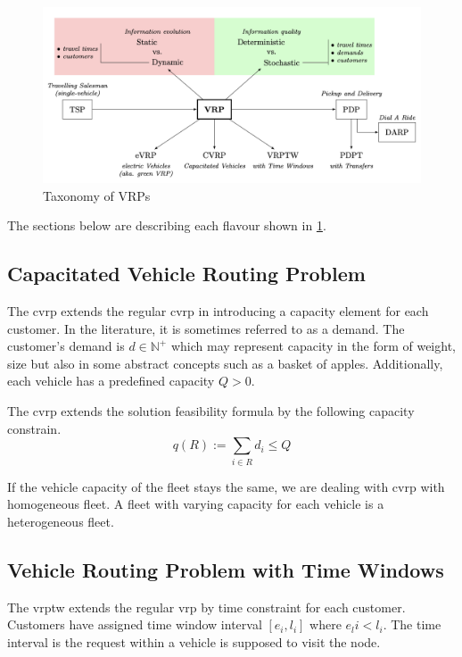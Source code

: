     \begin{figure}[ht]
        \centering
        \includegraphics[width=1.0\textwidth]{resources/intro/vrp-flavours.png}
        \caption{Taxonomy of VRPs \cite{bono-stochastic-vrp}}
        \label{fig:vrp-flavours}
    \end{figure}

The sections below are describing each flavour shown in \ref{fig:vrp-flavours}.

    \subsection{Capacitated Vehicle Routing Problem}
    The \gls{cvrp} extends the regular \gls{cvrp} in introducing a capacity element for each customer. In the literature, it is sometimes referred to as a demand. The customer's demand is $d \in \mathbb{N}^+$ which may represent capacity in the form of weight, size but also in some abstract concepts such as a basket of apples. Additionally, each vehicle has a predefined capacity $Q > 0$.
    
    The \gls{cvrp} extends the solution feasibility formula by the following capacity constrain.
    \begin{equation}
        q(R) := \sum_{i \in R} d_i \leq Q
    \end{equation}
    
    If the vehicle capacity of the fleet stays the same, we are dealing with \gls{cvrp} with homogeneous fleet. A fleet with varying capacity for each vehicle is a heterogeneous fleet.
    
    \subsection{Vehicle Routing Problem with Time Windows}
    The \gls{vrptw} \cite{vrptw-solomon} extends the regular \gls{vrp} by time constraint for each customer. Customers have assigned time window interval $[e_i, l_i]$ where $e_li < l_i$. The time interval is the request within a vehicle is supposed to visit the node. 
    
